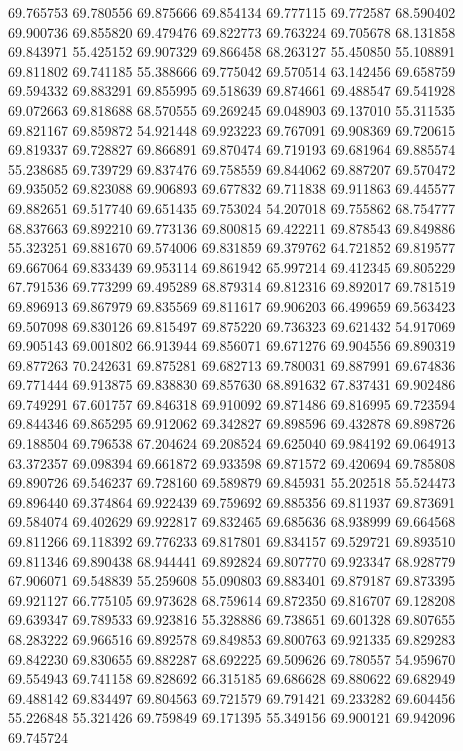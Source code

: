 69.765753
69.780556
69.875666
69.854134
69.777115
69.772587
68.590402
69.900736
69.855820
69.479476
69.822773
69.763224
69.705678
68.131858
69.843971
55.425152
69.907329
69.866458
68.263127
55.450850
55.108891
69.811802
69.741185
55.388666
69.775042
69.570514
63.142456
69.658759
69.594332
69.883291
69.855995
69.518639
69.874661
69.488547
69.541928
69.072663
69.818688
68.570555
69.269245
69.048903
69.137010
55.311535
69.821167
69.859872
54.921448
69.923223
69.767091
69.908369
69.720615
69.819337
69.728827
69.866891
69.870474
69.719193
69.681964
69.885574
55.238685
69.739729
69.837476
69.758559
69.844062
69.887207
69.570472
69.935052
69.823088
69.906893
69.677832
69.711838
69.911863
69.445577
69.882651
69.517740
69.651435
69.753024
54.207018
69.755862
68.754777
68.837663
69.892210
69.773136
69.800815
69.422211
69.878543
69.849886
55.323251
69.881670
69.574006
69.831859
69.379762
64.721852
69.819577
69.667064
69.833439
69.953114
69.861942
65.997214
69.412345
69.805229
67.791536
69.773299
69.495289
68.879314
69.812316
69.892017
69.781519
69.896913
69.867979
69.835569
69.811617
69.906203
66.499659
69.563423
69.507098
69.830126
69.815497
69.875220
69.736323
69.621432
54.917069
69.905143
69.001802
66.913944
69.856071
69.671276
69.904556
69.890319
69.877263
70.242631
69.875281
69.682713
69.780031
69.887991
69.674836
69.771444
69.913875
69.838830
69.857630
68.891632
67.837431
69.902486
69.749291
67.601757
69.846318
69.910092
69.871486
69.816995
69.723594
69.844346
69.865295
69.912062
69.342827
69.898596
69.432878
69.898726
69.188504
69.796538
67.204624
69.208524
69.625040
69.984192
69.064913
63.372357
69.098394
69.661872
69.933598
69.871572
69.420694
69.785808
69.890726
69.546237
69.728160
69.589879
69.845931
55.202518
55.524473
69.896440
69.374864
69.922439
69.759692
69.885356
69.811937
69.873691
69.584074
69.402629
69.922817
69.832465
69.685636
68.938999
69.664568
69.811266
69.118392
69.776233
69.817801
69.834157
69.529721
69.893510
69.811346
69.890438
68.944441
69.892824
69.807770
69.923347
68.928779
67.906071
69.548839
55.259608
55.090803
69.883401
69.879187
69.873395
69.921127
66.775105
69.973628
68.759614
69.872350
69.816707
69.128208
69.639347
69.789533
69.923816
55.328886
69.738651
69.601328
69.807655
68.283222
69.966516
69.892578
69.849853
69.800763
69.921335
69.829283
69.842230
69.830655
69.882287
68.692225
69.509626
69.780557
54.959670
69.554943
69.741158
69.828692
66.315185
69.686628
69.880622
69.682949
69.488142
69.834497
69.804563
69.721579
69.791421
69.233282
69.604456
55.226848
55.321426
69.759849
69.171395
55.349156
69.900121
69.942096
69.745724
